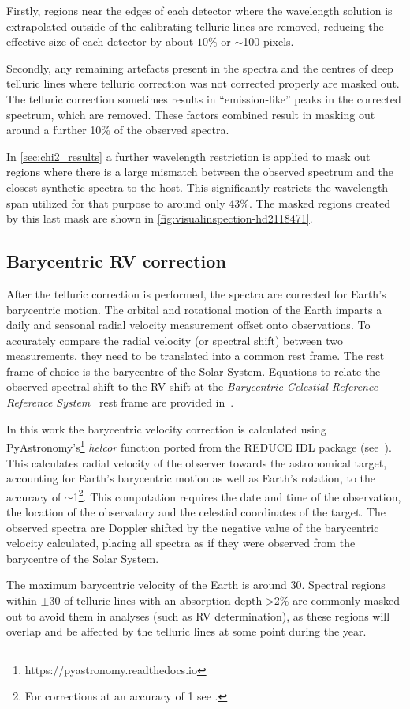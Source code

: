 Firstly, regions near the edges of each detector where the wavelength solution is extrapolated outside of the calibrating telluric lines are removed, reducing the effective size of each detector by about \(10\%\) or \(\sim\)100 pixels.

Secondly, any remaining artefacts present in the spectra and the centres of deep telluric lines where telluric correction was not corrected properly are masked out.
The telluric correction sometimes results in ``emission-like'' peaks in the corrected spectrum, which are removed.
These factors combined result in masking out around a further 10\% of the observed spectra.

In \cref{sec:chi2_results} a further wavelength restriction is applied to mask out regions where there is a large mismatch between the observed spectrum and the closest synthetic spectra to the host.
This significantly restricts the wavelength span utilized for that purpose to around only 43\%.
The masked regions created by this last mask are shown in \cref{fig:visualinspection-hd2118471}.


\subsection{Barycentric {RV} correction}
\label{subsec:barycentriccorrection}
After the telluric correction is performed, the spectra are corrected for Earth's barycentric motion.
The orbital and rotational motion of the Earth imparts a daily and seasonal radial velocity measurement offset onto observations.
To accurately compare the radial velocity (or spectral shift) between two measurements, they need to be translated into a common rest frame.
The rest frame of choice is the barycentre of the Solar System.
Equations to relate the observed spectral shift to the {RV} shift at the \textit{Barycentric Celestial Reference Reference System}~\citep{rickman_transactions_2001} rest frame are provided in~\citet{lindegren_fundamental_2003}.

In this work the barycentric velocity correction is calculated using PyAstronomy's\footnote{https://pyastronomy.readthedocs.io} \emph{helcor} function ported from the REDUCE IDL package (see~\citet[][]{piskunov_new_2002}).
This calculates radial velocity of the observer towards the astronomical target, accounting for Earth's barycentric motion as well as Earth's rotation, to the accuracy of \(\sim\)1\mps{}\footnote{For corrections at an accuracy of 1\cmps{} see \citet{wright_barycentric_2014, shubham_shbhuk/barycorrpy_2018}.}.
This computation requires the date and time of the observation, the location of the observatory and the celestial coordinates of the target.
The observed spectra are Doppler shifted by the negative value of the barycentric velocity calculated, placing all spectra as if they were observed from the barycentre of the Solar System.

The maximum barycentric velocity of the Earth is around 30\kmps{}.
Spectral regions within $\pm30$\kmps{} of telluric lines with an absorption depth >2\% are commonly masked out to avoid them in analyses (such as {RV} determination), as these regions will overlap and be affected by the telluric lines at some point during the year.
